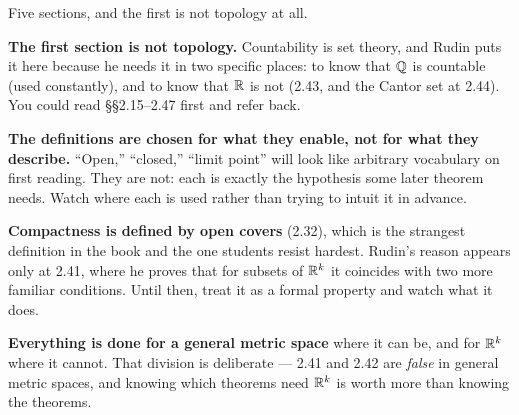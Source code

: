 \begin{roadmap}
Five sections, and the first is not topology at all.

\medskip
\centering
{}

\medskip
\raggedright
\textbf{The first section is not topology.} Countability is set theory, and
Rudin puts it here because he needs it in two specific places: to know that
$\mathbb{Q}$ is countable (used constantly), and to know that $\mathbb{R}$ is not (2.43, and
the Cantor set at 2.44). You could read \S\S2.15--2.47 first and refer back.

\smallskip
\textbf{The definitions are chosen for what they enable, not for what they
describe.} ``Open,'' ``closed,'' ``limit point'' will look like arbitrary
vocabulary on first reading. They are not: each is exactly the hypothesis some
later theorem needs. Watch where each is used rather than trying to intuit it
in advance.

\smallskip
\textbf{Compactness is defined by open covers} (2.32), which is the strangest
definition in the book and the one students resist hardest. Rudin's reason
appears only at 2.41, where he proves that for subsets of $\mathbb{R}^k$ it coincides
with two more familiar conditions. Until then, treat it as a formal property
and watch what it does.

\smallskip
\textbf{Everything is done for a general metric space} where it can be, and for
$\mathbb{R}^k$ where it cannot. That division is deliberate --- 2.41 and 2.42 are
\emph{false} in general metric spaces, and knowing which theorems need $\mathbb{R}^k$
is worth more than knowing the theorems.
\end{roadmap}


